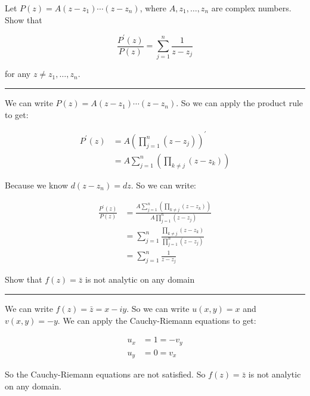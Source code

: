 \begin{example}

    Let $P(z)=A(z-z_1)\cdots(z-z_n)$, where $A,z_1,\ldots,z_n$ are complex numbers. Show that

    $$\frac{P^{\prime}(z)}{P(z)}=\sum_{j=1}^n\frac1{z-z_j}$$

    for any $z\neq z_1,\ldots,z_n.$ \\

    \hrule
    \vspace{0.5cm}

    We can write $P(z) = A(z-z_1)\cdots(z-z_n)$. So we can apply the product rule to get:

    \begin{align*}
        P^{\prime}(z) & = A\left(\prod_{j=1}^n(z-z_j)\right)^{\prime}      \\
                      & = A\sum_{j=1}^n\left(\prod_{k\neq j}(z-z_k)\right)
    \end{align*}

    Because we know $d(z-z_n) = dz$. So we can write:

    \begin{align*}
        \frac{P^{\prime}(z)}{P(z)} & = \frac{A\sum_{j=1}^n\left(\prod_{k\neq j}(z-z_k)\right)}{A\prod_{j=1}^n(z-z_j)} \\
                                   & = \sum_{j=1}^n\frac{\prod_{k\neq j}(z-z_k)}{\prod_{j=1}^n(z-z_j)}                \\
                                   & = \sum_{j=1}^n\frac1{z-z_j}
    \end{align*}

\end{example}

\begin{example}

    Show that $f(z)=\bar{z}$ is not analytic on any domain \\

    \hrule
    \vspace{0.5cm}

    We can write $f(z) = \bar{z} = x-iy$. So we can write $u(x,y) = x$ and $v(x,y) = -y$. We can apply the Cauchy-Riemann equations to get:

    \begin{align*}
        u_x & = 1 = -v_y \\
        u_y & = 0 = v_x
    \end{align*}

    So the Cauchy-Riemann equations are not satisfied. So $f(z) = \bar{z}$ is not analytic on any domain.

\end{example}


